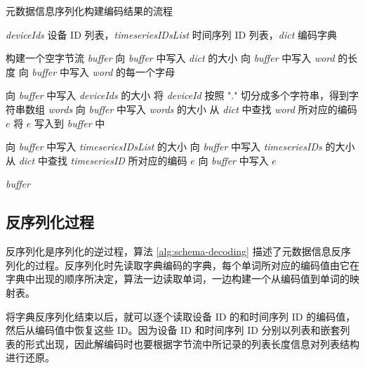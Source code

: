 \begin{algorithm}
  \caption{元数据信息序列化构建编码结果的流程}
  \label{alg:schema-build-encoding}
  \small
  \begin{algorithmic}
    \REQUIRE \emph{deviceIds} 设备 ID 列表，\emph{timeseriesIDsList} 时间序列 ID 列表，\emph{dict} 编码字典

    \STATE 构建一个空字节流 \emph{buffer}
    \STATE 向 \emph{buffer} 中写入 \emph{dict} 的大小
      \STATE 向 \emph{buffer} 中写入 \emph{word} 的长度
      \STATE 向 \emph{buffer} 中写入 \emph{word} 的每一个字母
    \ENDFOR
    
    \STATE 向 \emph{buffer} 中写入 \emph{deviceIds} 的大小
      \STATE 将 \emph{deviceId} 按照 "." 切分成多个字符串，得到字符串数组 \emph{words}
      \STATE 向 \emph{buffer} 中写入 \emph{words} 的大小
        \STATE 从 \emph{dict} 中查找 \emph{word} 所对应的编码 $e$
        \STATE 将 $e$ 写入到 \emph{buffer} 中
      \ENDFOR
    \ENDFOR

    \STATE 向 \emph{buffer} 中写入 \emph{timeseriesIDsList} 的大小
      \STATE 向 \emph{buffer} 中写入 \emph{timeseriesIDs} 的大小
      \STATE 从 \emph{dict} 中查找 \emph{timeseriesID} 所对应的编码 $e$
      \STATE 向 \emph{buffer} 中写入 $e$
      \ENDFOR
    \ENDFOR

    \RETURN \emph{buffer}


  \end{algorithmic}
\end{algorithm}

\subsection{反序列化过程}
反序列化是序列化的逆过程，算法 \ref{alg:schema-decoding} 描述了元数据信息反序列化的过程。反序列化时先读取字典编码的字典，每个单词所对应的编码值由它在字典中出现的顺序所决定，算法一边读取单词，一边构建一个从编码值到单词的映射表。

将字典反序列化结束以后，就可以逐个读取设备 ID 的和时间序列 ID 的编码值，然后从编码值中恢复这些 ID。因为设备 ID 和时间序列 ID 分别以列表和嵌套列表的形式出现，因此解编码时也要根据字节流中所记录的列表长度信息对列表结构进行还原。


